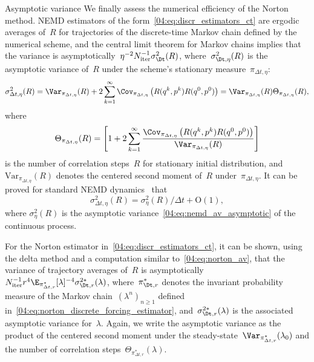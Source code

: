     \begin{subsection}{Asymptotic variance}\label{04:subsec:numerical_av}
    We finally assess the numerical efficiency of the Norton method. NEMD estimators of the form~\eqref{04:eq:discr_estimators_ct} are ergodic averages of~$R$ for trajectories of the discrete-time Markov chain defined by the numerical scheme, and the central limit theorem for Markov chains implies that the variance is asymptotically~$\eta^{-2}N_{\mathrm{iter}}^{-1}\sigma^2_{\Dt}(R)$, where~$\sigma^2_{\Dt,\eta}(R)$ is the asymptotic variance of~$R$ under the scheme's stationary measure~$\pi_{\Delta t,\eta}$:
    \begin{equation}
        \label{04:eq:discr_av_rhohat}
        \sigma^2_{\Delta t,\eta}(R) = \Var_{\pi_{\Delta t,\eta}}(R) + 2\sum_{k=1}^\infty \Cov_{\pi_{\Delta t,\eta}}\left(R(q^k,p^k)R(q^0,p^0)\right) = \Var_{\pi_{\Delta t,\eta}}(R)\Theta_{\pi_{\Delta t,\eta}}(R),
    \end{equation}
    where 
    \begin{equation}
        \label{04:eq:discr_correlation_time}
        \Theta_{\pi_{\Delta t,\eta}}(R)=\left[1 + 2\sum_{k=1}^\infty \frac{\Cov_{\pi_{\Delta t,\eta}}\left(R(q^k,p^k)R(q^0,p^0)\right)}{\Var_{\pi_{\Delta t,\eta}}(R)}\right]
    \end{equation}
    is the number of correlation steps~$R$ for stationary initial distribution, and~$\mathrm{Var}_{\pi_{\Delta t,\eta}}(R)$ denotes the centered second moment of~$R$ under~$\pi_{\Delta t,\eta}$. It can be proved for standard NEMD dynamics~\cite{LS16} that
    \[\sigma^2_{\Delta t,\eta}(R) = \sigma^2_\eta(R)/\Delta t + \mathrm{O}(1),\]
    where $\sigma_\eta^2(R)$ is the asymptotic variance~\eqref{04:eq:nemd_av_asymptotic} of the continuous process.

    For the Norton estimator in~\eqref{04:eq:discr_estimators_ct}, it can be shown, using the delta method and a computation similar to~\eqref{04:eq:norton_av}, that the variance of trajectory averages of~$R$ is asymptotically~$N_{\mathrm{iter}}^{-1}r^4\E_{\pi_{\Delta t,r}^*}[\lambda]^{-4}\sigma^{2*}_{\Dt,r}(\lambda)$, where~$\pi_{\Dt,r}^*$ denotes the invariant probability measure of the Markov chain~$(\lambda^n)_{n\geq 1}$ defined in~\eqref{04:eq:norton_discrete_forcing_estimator}, and~$\sigma^{2*}_{\Dt,r}(\lambda)$  is the associated asymptotic variance for~$\lambda$. Again, we write the asymptotic variance as the product of the centered second moment under the steady-state~$\Var_{\pi_{\Delta t,r}^*}(\lambda_0)$ and the number of correlation steps~$\Theta_{\pi_{\Delta t,r}^*}(\lambda)$.


\end{subsection}
